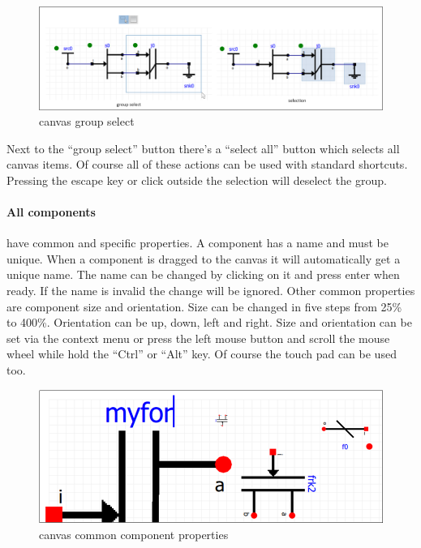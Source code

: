 \begin{figure}[here]
\begin{center}	
	\includegraphics[width=.70\linewidth]{pictures/canvas-selection}
	\caption{canvas group select}
	\label{fig:canvas-selection}
\end{center}
\end{figure}

Next to the ``group select'' button there's a ``select all'' button which selects all
canvas items. Of course all of these actions can be used with standard
shortcuts. Pressing the escape key or click outside the selection will deselect the group.

\paragraph{All components}have common and specific properties. A component
has a name and must be unique. When a component is dragged to the canvas it will
automatically get a unique name. The name can be changed by clicking on it and
press enter when ready. If the name is invalid the change will be ignored. Other
common properties are component size and orientation. Size can be changed in
five steps from 25\% to 400\%. Orientation can be up, down, left and right. Size
and orientation can be set via the context menu or press the left mouse button
and scroll the mouse wheel while hold the ``Ctrl'' or ``Alt'' key. Of course the
touch pad can be used too.

\begin{figure}[here]
\begin{center}	
	\includegraphics[width=.70\linewidth]{pictures/component-common-properties}
	\caption{canvas common component properties}
	\label{fig:component-common-properties}
\end{center}
\end{figure}

